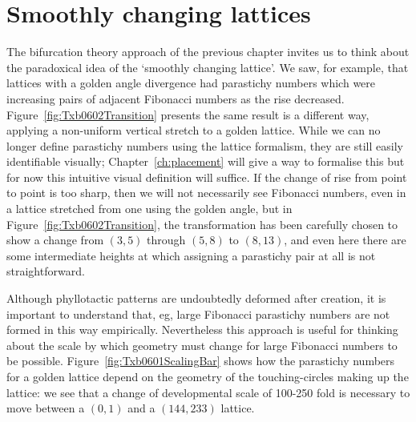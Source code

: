 \section{Smoothly changing lattices}
The bifurcation theory approach of the previous chapter invites us to think about the paradoxical idea of the `smoothly changing lattice'. We saw, for example, that lattices with a golden angle divergence had parastichy numbers which were increasing pairs of adjacent Fibonacci numbers as the rise decreased. Figure~\ref{fig:Txb0602Transition} presents the same result is a different way, applying a non-uniform vertical stretch to a golden lattice.
While we can no longer define parastichy numbers using the lattice formalism, they are still easily identifiable visually;  Chapter~\ref{ch:placement} will give a  way to formalise this but for now this intuitive visual definition will suffice. 
%
If the change of rise from point to point is too sharp, 
then we will not necessarily see Fibonacci numbers, even in a lattice stretched from one using the golden angle, but in Figure~\ref{fig:Txb0602Transition}, the transformation has been carefully chosen to show a change from  $(3,5)$ through $(5,8)$ to $(8,13)$, and even here there are some intermediate heights at which assigning a parastichy pair at all is not straightforward. 

Although phyllotactic patterns are undoubtedly deformed after creation, it is important to understand that, eg, large Fibonacci parastichy numbers are not formed in this way empirically. Nevertheless this approach is useful for thinking about the scale by which geometry must change for large Fibonacci numbers to be possible. Figure~\ref{fig:Txb0601ScalingBar}  shows how the parastichy numbers for a golden lattice depend on the geometry of the touching-circles making up the lattice: we see that a change of developmental scale of 100-250 fold is necessary to move between a $(0,1)$ and a $(144,233)$ lattice.

%




